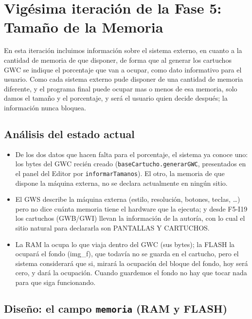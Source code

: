 \section{Vigésima iteración de la Fase 5: Tamaño de la Memoria}
\label{sec:F5I20}

En esta iteración incluimos información sobre el sistema externo, en cuanto a la cantidad de memoria de que disponer, de forma que al generar los cartuchos GWC se indique el porcentaje que van a ocupar, como dato informativo para el usuario. Como cada sistema externo pude disponer de una cantidad de memoria diferente, y el programa final puede ocupar mas o menos de esa memoria, solo damos el tamaño y el porcentaje, y será el usuario quien decide después; la información nunca bloquea.

\subsection{Análisis del estado actual}
\label{sec:F5I20Analisis}

\begin{itemize}
	\item De los dos datos que hacen falta para el porcentaje, el sistema ya
	conoce uno: los bytes del GWC recién creado
	(\texttt{baseCartucho.generarGWC}, presentados en el panel del Editor por
	\texttt{informarTamanos}). El otro, la memoria de que dispone la máquina
	externa, no se declara actualmente en ningún sitio.
	\item El GWS describe la máquina externa (estilo, resolución, botones,
	teclas, \ldots) pero no dice cuánta memoria tiene el hardware que la
	ejecuta; y desde F5-I19 los cartuchos (GWB/GWI) llevan la información de
	la autoría, con lo cual el sitio natural para declararla son PANTALLAS Y
	CARTUCHOS.
	\item La RAM la ocupa lo que viaja dentro del GWC (sus bytes); la FLASH la
	ocupará el fondo (img\_f), que todavía no se guarda en el cartucho, pero el sistema considerará que si, mirará la ocupación del bloque del fondo, hoy será cero, y dará la ocupación. Cuando guardemos el fondo no hay que tocar nada para que siga funcionando.
\end{itemize}

\subsection{Diseño: el campo \texttt{memoria} (RAM y FLASH)}
\label{sec:F5I20Diseno}

